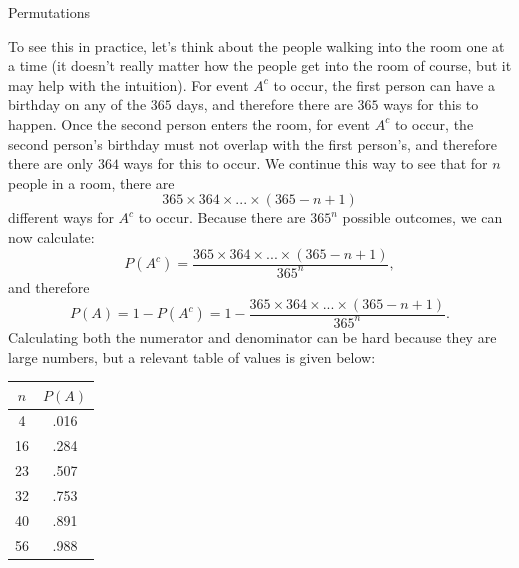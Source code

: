 \begin{frame}[allowframebreaks]{Permutations}
{    To see this in practice, let's think about the people walking into the room one at a time (it doesn't really matter how the people get into the room of course, but it may help with the intuition).
    For event $A^c$ to occur, the first person can have a birthday on any of the $365$ days, and therefore there are $365$ ways for this to happen.
    Once the second person enters the room, for event $A^c$ to occur, the second person's birthday must not overlap with the first person's, and therefore there are only $364$ ways for this to occur. We continue this way to see that for $n$ people in a room, there are
    $$
    365 \times 364 \times ... \times (365 - n + 1)
    $$
    different ways for $A^c$ to occur.
    Because there are $365^n$ possible outcomes, we can now calculate:
    $$
    P(A^c) = \frac{365 \times 364 \times ... \times (365 - n + 1)}{365^n},
    $$
    and therefore
    $$
    P(A) = 1 - P(A^c) = 1 - \frac{365 \times 364 \times ... \times (365 - n + 1)}{365^n}.
    $$
    Calculating both the numerator and denominator can be hard because they are large numbers, but a relevant table of values is given below: 
    \begin{table}
    \centering
    \begin{tabular}{cc}
      $n$ & $P(A)$ \\\hline
      4 & .016 \\
      16 & .284 \\
      23 & .507 \\
      32 & .753 \\
      40 & .891 \\
      56 & .988 \\\hline
    \end{tabular}
    \end{table}
  }
  
\end{frame}

